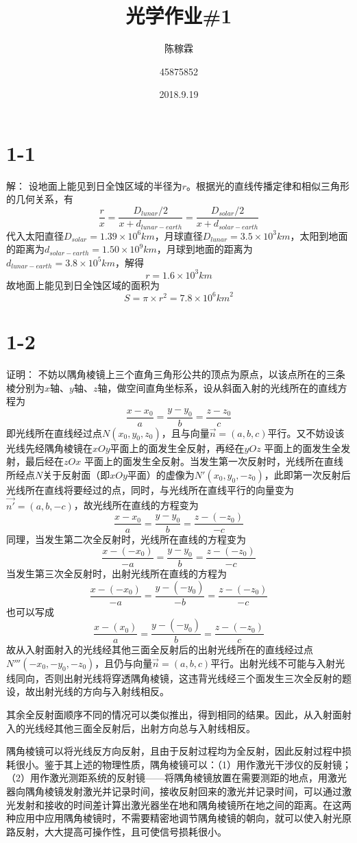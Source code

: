 \documentclass[10pt,a4paper]{article}
\title{光学作业\#1}
\author{陈稼霖 \and 45875852}
\date{2018.9.19}
\theoremstyle{remark}
\begin{document}
\maketitle
\section*{1-1}解：
设地面上能见到日全蚀区域的半径为$r$。根据光的直线传播定律和相似三角形的几何关系，有
\[
\frac{r}{x} = \frac{D_{lunar} / 2}{x + d_{lunar-earth}} = \frac{D_{solar} / 2}{x + d_{solar-earth}}
\]
代入太阳直径$D_{solar} = 1.39\times10^6km$，月球直径$D_{lunar} = 3.5\times10^3km$，太阳到地面的距离为$d_{solar-earth} = 1.50\times10^9km$，月球到地面的距离为$d_{lunar-earth} = 3.8\times10^5km$，解得
\[
r = 1.6\times10^3km
\]
故地面上能见到日全蚀区域的面积为
\[
S = \pi\times r^2 = 7.8\times10^6{km}^2
\]
\section*{1-2}证明：
不妨以隅角棱镜上三个直角三角形公共的顶点为原点，以该点所在的三条棱分别为$x$轴、$y$轴、$z$轴，做空间直角坐标系，设从斜面入射的光线所在的直线方程为
\[
\frac{x - x_0}{a} = \frac{y - y_0}{b} = \frac{z - z_0}{c}
\]
即光线所在直线经过点$N(x_0,y_0,z_0)$，且与向量$\overrightarrow{n} = (a,b,c)$平行。又不妨设该光线先经隅角棱镜在$xOy$平面上的面发生全反射，再经在$yOz$ 平面上的面发生全发射，最后经在$zOx$ 平面上的面发生全反射。当发生第一次反射时，光线所在直线所经点$N$关于反射面（即$xOy$平面）的虚像为$N'(x_0,y_0,-z_0)$，此即第一次反射后光线所在直线将要经过的点，同时，与光线所在直线平行的向量变为$\overrightarrow{n'} = (a,b,-c)$，故光线所在直线的方程变为
\[
\frac{x - x_0}{a} = \frac{y - y_0}{b} = \frac{z - (-z_0)}{-c}
\]
同理，当发生第二次全反射时，光线所在直线的方程变为
\[
\frac{x - (-x_0)}{-a} = \frac{y - y_0}{b} = \frac{z - (-z_0)}{-c}
\]
当发生第三次全反射时，出射光线所在直线的方程为
\[
\frac{x - (-x_0)}{-a} = \frac{y - (-y_0)}{-b} = \frac{z - (-z_0)}{-c}
\]
也可以写成
\[
\frac{x - (x_0)}{a} = \frac{y - (-y_0)}{b} = \frac{z - (-z_0)}{c}
\]
故从入射面射入的光线经其他三面全反射后的出射光线所在的直线经过点$N'''(-x_0,-y_0,-z_0)$，且仍与向量$\overrightarrow{n} = (a,b,c)$平行。出射光线不可能与入射光线同向，否则出射光线将穿透隅角棱镜，这违背光线经三个面发生三次全反射的题设，故出射光线的方向与入射线相反。

其余全反射面顺序不同的情况可以类似推出，得到相同的结果。因此，从入射面射入的光线经其他三面全反射后，出射方向总与入射线相反。

隅角棱镜可以将光线反方向反射，且由于反射过程均为全反射，因此反射过程中损耗很小。鉴于其上述的物理性质，隅角棱镜可以：（1）用作激光干涉仪的反射镜；（2）用作激光测距系统的反射镜——将隅角棱镜放置在需要测距的地点，用激光器向隅角棱镜发射激光并记录时间，接收反射回来的激光并记录时间，可以通过激光发射和接收的时间差计算出激光器坐在地和隅角棱镜所在地之间的距离。在这两种应用中应用隅角棱镜时，不需要精密地调节隅角棱镜的朝向，就可以使入射光原路反射，大大提高可操作性，且可使信号损耗很小。
\end{document}

